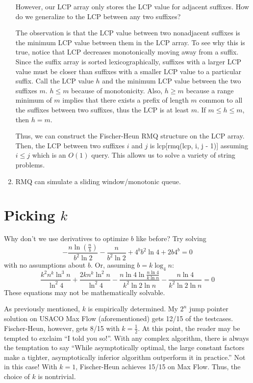 \documentclass[11pt, oneside]{article}
\begin{document}
\begin{enumerate}
  However, our LCP array only stores the LCP value for adjacent suffixes.
  How do we generalize to the LCP between any two suffixes?

  The observation is that the LCP value between two nonadjacent suffixes
  is the minimum LCP value between them in the LCP array.
  To see why this is true, notice that LCP decreases monotonically moving away from a suffix.
  Since the suffix array is sorted lexicographically, suffixes with a larger LCP
  value must be closer than suffixes with a smaller LCP value to a particular suffix.
  Call the LCP value \( h \) and the minimum LCP value between the two suffixes \( m \).
  \( h \leq m \) because of monotonicity.
  Also, \( h \geq m \) because a range minimum of \( m \) implies that there exists a prefix of length \( m \)
  common to all the suffixes between two suffixes, thus the LCP is at least \( m \).
  If \( m \leq h \leq m \), then \( h = m \).

  Thus, we can construct the Fischer-Heun RMQ structure on the LCP array.
  Then, the LCP between two suffixes \( i \) and \( j \) is lcp[rmq(lcp, i, j - 1)] assuming \( i \leq j \)
  which is an \( O(1) \) query. This allows us to solve a variety of string problems.

  \item RMQ can simulate a sliding window/monotonic queue.

\end{enumerate}

\newpage

\section{Picking \( k \)}

Why don't we use derivatives to optimize \( b \) like before?
Try solving
\[ -\frac{n \ln(\frac{n}{b})}{b^2 \ln 2} - \frac{n}{b^2 \ln 2} +
4^b b^2 \ln 4 + 2b 4^b = 0 \]
with no assumptions about \( b \).
Or, assuming \( b = k \log_4 n \):
\[ \frac{k^2 n^k \ln^3 n}{\ln^2 4} + \frac{2k n^k \ln^2 n}{\ln^2 4}
- \frac{n \ln 4 \ln{\frac{n \ln 4}{k \ln n}}}{k^2 \ln 2 \ln n}
- \frac{n \ln 4}{k^2 \ln 2 \ln n} = 0 \]
These equations may not be mathematically solvable.

As previously mentioned, \( k \) is empirically determined. My \( 2^n \) jump pointer solution
on USACO Max Flow (aforementioned) gets 12/15 of the testcases. Fischer-Heun, however,
gets 8/15 with \( k = \frac{1}{2} \). At this point, the reader may be tempted to exclaim ``I told you so!''.
With any complex algorithm, there is always the temptation to say ``While asymptotically optimal,
the large constant factors make a tighter, asymptotically inferior algorithm outperform it in practice.''
Not in this case! With \( k = 1 \), Fischer-Heun achieves 15/15 on Max Flow. Thus, the choice of \( k \) is nontrivial.
\end{document}
